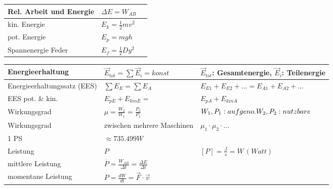 \begin{tabularx}{\columnwidth}{@{}XXX@{}}
	Rel. Arbeit und Energie                   & $\Delta E = W_{AB}$                                                                                                                                                                                   \\ \hline
	kin. Energie                              & $E_k = \frac{1}{2}mv^2$                                                                                                                                                                               \\ \hline
	pot. Energie                              & $E_p = mgh$                                                                                                                                                                                           \\ \hline
	Spannenergie Feder                        & $E_f = \frac{1}{2}Dy^2$                                                                                                                                                                               \\ \hline
\end{tabularx}
\noindent
\begin{tabularx}{\columnwidth}{@{}XXX@{}}
	Energieerhaltung            & $ \vec{E}_{tot} = \sum \vec{E}_i = konst $                           & $\vec{E}_{tot}$: Gesamtenergie, $\vec{E}_{i}$: Teilenergie \\ \hline
	Energieerhaltungssatz (EES) & $\sum E_E = \sum E_A$                                                & $E_{E1} + E_{E2} + ... = E_{A1} + E_{A2} + ...$            \\ \hline
	EES pot. \& kin.            & $E_{pE} + E_{kinE} =$                                                & $E_{pA} + E_{kinA}$                                        \\ \hline
	Wirkungsgrad                & $\mu = \frac{W_2}{W_1} = \frac{P_2}{P_1}$                            & $W_1,P_1: aufgeno.\linebreak W_2,P_2: nutzbare$            \\ \hline
	Wirkungsgrad                & zwischen mehrere Maschinen                                           & $\mu_1 \cdot \mu_2 \cdot ...$                              \\ \hline
	1 PS                        & $\approx 735.499 W$                                                                                                               \\ \hline
	Leistung                    & $P$                                                                  & $[P] = \frac{J}{s} = W\,(Watt)$                            \\ \hline
	mittlere Leistung           & $\overline{P} = \frac{W_{AB}}{\Delta t} = \frac{\Delta E}{\Delta t}$                                                              \\ \hline
	momentane Leistung          & $P = \frac{dW}{dt} = \vec{F}\cdot\vec{v}$                                                                                         \\ \hline
\end{tabularx}
